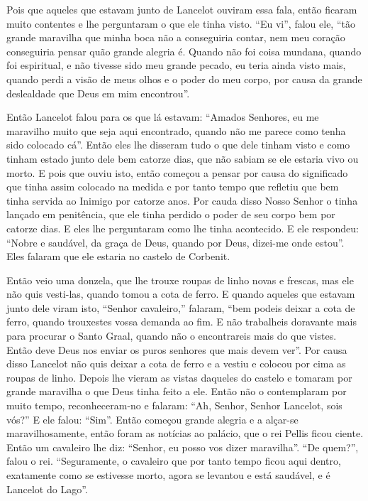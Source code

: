 Pois que aqueles que estavam junto de Lancelot ouviram essa fala, então ficaram
muito contentes e lhe perguntaram o que ele tinha visto. “Eu vi”, falou ele,
“tão grande maravilha que minha boca não a conseguiria contar, nem meu coração
conseguiria pensar quão grande alegria é. Quando não foi coisa mundana, quando
foi espiritual, e não tivesse sido meu grande pecado, eu teria ainda visto
mais, quando perdi a visão de meus olhos e o poder do meu corpo, por causa da
grande deslealdade que Deus em mim encontrou”. 

Então Lancelot falou para os que lá estavam: “Amados Senhores, eu me maravilho
muito que seja aqui encontrado, quando não me parece como tenha sido colocado
cá”. Então eles lhe disseram tudo o que dele tinham visto e como tinham estado
junto dele bem catorze dias, que não sabiam se ele estaria vivo ou morto. E
pois que ouviu isto, então começou a pensar por causa do significado que tinha
assim colocado na medida e por tanto tempo que refletiu que bem tinha servida
ao Inimigo por catorze anos. Por cauda disso Nosso Senhor o tinha lançado em
penitência, que ele tinha perdido o poder de seu corpo bem por catorze dias. 
E eles lhe perguntaram como lhe tinha acontecido. E ele respondeu: “Nobre
e saudável, da graça de Deus, quando por Deus, dizei-me onde estou”. Eles
falaram que ele estaria no castelo de Corbenit. 

Então veio uma donzela, que lhe trouxe roupas de linho novas e frescas, mas ele
não quis vesti-las, quando tomou a cota de ferro. E quando aqueles que estavam
junto dele viram isto, “Senhor cavaleiro,” falaram, “bem podeis deixar a cota
de ferro, quando trouxestes vossa demanda ao fim. E não trabalheis doravante
mais para procurar o Santo Graal, quando não o encontrareis mais do que vistes.
Então deve Deus nos enviar os puros senhores que mais devem ver”. Por causa
disso Lancelot não quis deixar a cota de ferro e a vestiu e colocou por cima
as roupas de linho. Depois lhe vieram as vistas daqueles do castelo e tomaram
por grande maravilha o que Deus tinha feito a ele. Então não o contemplaram por
muito tempo, reconheceram-no e falaram: “Ah, Senhor, Senhor Lancelot, sois
vós?” E ele falou: “Sim”. Então começou grande alegria e a alçar-se
maravilhosamente, então foram as notícias ao palácio, que o rei Pellis ficou
ciente. Então um cavaleiro lhe diz: “Senhor, eu posso vos dizer maravilha”. “De
quem?”, falou o rei. “Seguramente, o cavaleiro que por tanto tempo ficou aqui
dentro, exatamente como se estivesse morto, agora se levantou e está saudável,
e é Lancelot do Lago”.

